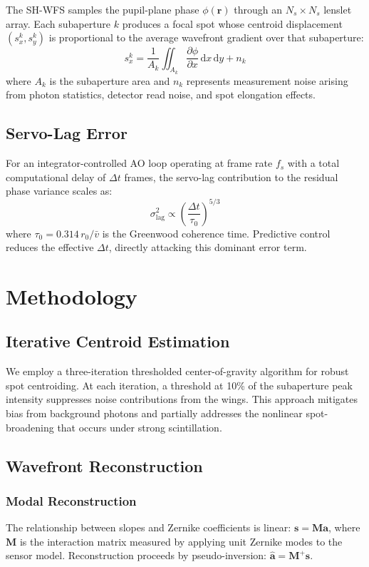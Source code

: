 \documentclass[conference]{IEEEtran}
\begin{document}
The SH-WFS samples the pupil-plane phase $\phi(\mathbf{r})$ through an $N_s \times N_s$ lenslet array. Each subaperture $k$ produces a focal spot whose centroid displacement $(s_x^k, s_y^k)$ is proportional to the average wavefront gradient over that subaperture:
\begin{equation}
s_x^k = \frac{1}{A_k}\iint_{A_k} \frac{\partial \phi}{\partial x}\,\mathrm{d}x\,\mathrm{d}y + n_k
\end{equation}
where $A_k$ is the subaperture area and $n_k$ represents measurement noise arising from photon statistics, detector read noise, and spot elongation effects.

\subsection{Servo-Lag Error}

For an integrator-controlled AO loop operating at frame rate $f_s$ with a total computational delay of $\Delta t$ frames, the servo-lag contribution to the residual phase variance scales as:
\begin{equation}
\sigma_{\text{lag}}^2 \propto \left(\frac{\Delta t}{\tau_0}\right)^{5/3}
\end{equation}
where $\tau_0 = 0.314\,r_0/\bar{v}$ is the Greenwood coherence time. Predictive control reduces the effective $\Delta t$, directly attacking this dominant error term.

\section{Methodology}

\subsection{Iterative Centroid Estimation}

We employ a three-iteration thresholded center-of-gravity algorithm for robust spot centroiding. At each iteration, a threshold at 10\% of the subaperture peak intensity suppresses noise contributions from the wings. This approach mitigates bias from background photons and partially addresses the nonlinear spot-broadening that occurs under strong scintillation.

\subsection{Wavefront Reconstruction}

\subsubsection{Modal Reconstruction}
The relationship between slopes and Zernike coefficients is linear: $\mathbf{s} = \mathbf{M}\mathbf{a}$, where $\mathbf{M}$ is the interaction matrix measured by applying unit Zernike modes to the sensor model. Reconstruction proceeds by pseudo-inversion: $\hat{\mathbf{a}} = \mathbf{M}^+\mathbf{s}$.
\end{document}
